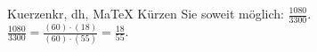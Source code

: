 \begin{MAufgabe}{Kuerzen}{kr, dh, MaTeX}
K\"urzen Sie soweit m\"oglich: $\frac{1080}{3300}$.\\ 
\ifLsg\MLoesung
\quad $\frac{1080}{3300}=\frac{(60)\cdot(18)}{(60)\cdot(55)}=\frac{18}{55}$.\else\relax\fi
 \end{MAufgabe}